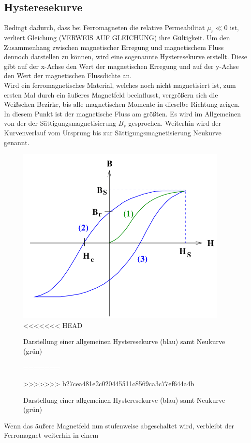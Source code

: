 \subsection{Hysteresekurve}

\noindent
Bedingt dadurch, dass bei Ferromagneten die relative Permeabilität $\mu_r \ll 0$ ist, verliert Gleichung (VERWEIS AUF GLEICHUNG)
ihre Gültigkeit. Um den Zusammenhang zwischen magnetischer Erregung und magnetischem Fluss dennoch darstellen zu können, wird
eine sogenannte Hysteresekurve erstellt. Diese gibt auf der x-Achse den Wert der magnetischen Erregung und auf der y-Achse
den Wert der magnetischen Flussdichte an. \\

Wird ein ferromagnetisches Material, welches noch nicht magnetisiert ist, zum ersten Mal durch ein äußeres
Magnetfeld beeinflusst, vergrößern sich die Weißschen Bezirke, bis alle magnetischen Momente in dieselbe Richtung zeigen.
In diesem Punkt ist der magnetische Fluss am größten. Es wird im Allgemeinen von der der Sättigungsmagnetisierung $B_s$ gesprochen.
Weiterhin wird der Kurvenverlauf vom Ursprung bis zur Sättigungsmagnetisierung Neukurve genannt.
\begin{figure}[H]
    \centering
    \includegraphics{content/Bild1.png}
<<<<<<< HEAD
    \caption{Darstellung einer allgemeinen Hysteresekurve (blau) samt Neukurve (grün) \cite {sample}}
=======
    \caption{Darstellung einer allgemeinen Hysteresekurve (blau) samt Neukurve (grün) }
>>>>>>> b27cea481e2c020445511c8569ca3c77ef644a4b
    \label{Hysteresekurve}
\end{figure}
\noindent
Wenn das äußere Magnetfeld nun stufenweise abgeschaltet wird, verbleibt der Ferromagnet weiterhin in einem
